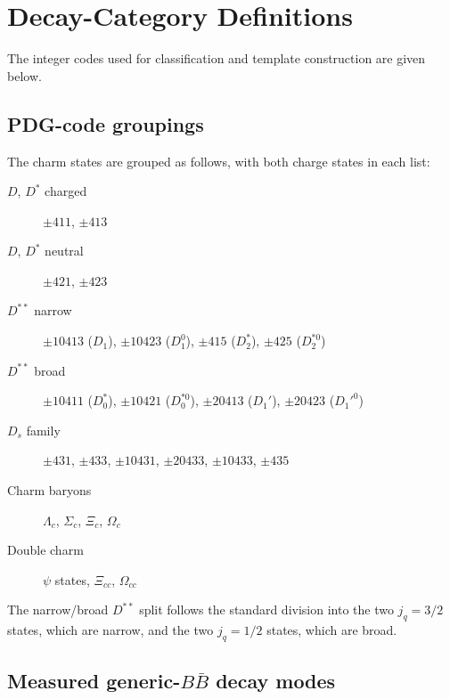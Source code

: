 \section{Decay-Category Definitions}
\label{app:categories}


The integer codes used for 
classification and template construction are given below.

\subsection{PDG-code groupings}
\label{app:categories:pdg}

The charm states are grouped as follows, with both charge states in each list:
\begin{description}
  \item[$D$, $D^{*}$ charged] $\pm411$, $\pm413$
  \item[$D$, $D^{*}$ neutral] $\pm421$, $\pm423$
  \item[$D^{**}$ narrow] $\pm10413$ ($D_{1}$), $\pm10423$ ($D_{1}^{0}$),
        $\pm415$ ($D_{2}^{*}$), $\pm425$ ($D_{2}^{*0}$)
  \item[$D^{**}$ broad] $\pm10411$ ($D_{0}^{*}$), $\pm10421$ ($D_{0}^{*0}$),
        $\pm20413$ ($D_{1}'$), $\pm20423$ ($D_{1}'^{0}$)
  \item[$D_{s}$ family] $\pm431$, $\pm433$, $\pm10431$, $\pm20433$,
        $\pm10433$, $\pm435$
  \item[Charm baryons] $\Lambda_{c}$, $\Sigma_{c}$, $\Xi_{c}$, $\Omega_{c}$
  \item[Double charm] $\psi$ states, $\Xi_{cc}$, $\Omega_{cc}$
\end{description}
The narrow/broad $D^{**}$ split follows the standard division into the two
$j_{q} = 3/2$ states, which are narrow, and the two $j_{q} = 1/2$ states,
which are broad.

\subsection{Measured generic-$B\bar{B}$ decay modes}
\label{app:categories:bbbar}

